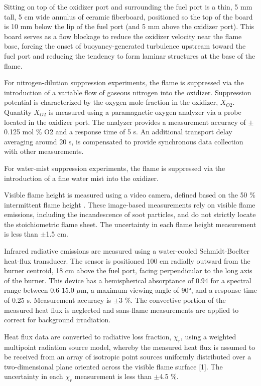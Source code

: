 \documentclass{article}
\begin{document}
Sitting on top of the oxidizer port and surrounding the fuel port is a thin, 5 mm tall, 5 cm wide annulus of ceramic fiberboard, positioned so the top of the board is 10 mm below the lip of the fuel port (and 5 mm above the oxidizer port). This board serves as a flow blockage to reduce the oxidizer velocity near the flame base, forcing the onset of buoyancy-generated turbulence upstream toward the fuel port and reducing the tendency to form laminar structures at the base of the flame.

For nitrogen-dilution suppression experiments, the flame is suppressed via the introduction of a variable flow of gaseous nitrogen into the oxidizer. Suppression potential is characterized by the oxygen mole-fraction in the oxidizer, $X_{O2}$. Quantity $X_{O2}$ is measured using a paramagnetic oxygen analyzer via a probe located in the oxidizer port. The analyzer provides a measurement accuracy of $\pm$0.125 mol \% O2 and a response time of 5 s. An additional transport delay averaging around 20 s, is compensated to provide synchronous data collection with other measurements.

For water-mist suppression experiments, the flame is suppressed via the introduction of a fine water mist into the oxidizer.

Visible flame height is measured using a video camera, defined based on the 50 \% intermittent flame height \cite{White:2015}. These image-based measurements rely on visible flame emissions, including the incandescence of soot particles, and do not strictly locate the stoichiometric flame sheet. The uncertainty in each flame height measurement is less than $\pm$1.5 cm.

Infrared radiative emissions are measured using a water-cooled Schmidt-Boelter heat-flux transducer. The sensor is positioned 100 cm radially outward from the burner centroid, 18 cm above the fuel port, facing perpendicular to the long axis of the burner. This device has a hemispherical absorptance of 0.94 for a spectral range between 0.6-15.0 $\mu$m, a maximum viewing angle of 90\si{\degree}, and a response time of 0.25 s. Measurement accuracy is $\pm$3 \%. The convective portion of the measured heat flux is neglected and sans-flame measurements are applied to correct for background irradiation.

Heat flux data are converted to radiative loss fraction, $\chi_r$, using a weighted multipoint radiation source model, whereby the measured heat flux is assumed to be received from an array of isotropic point sources uniformly distributed over a two-dimensional plane oriented across the visible flame surface [1]. The uncertainty in each $\chi_r$ measurement is less than $\pm$4.5 \%.
\end{document}
